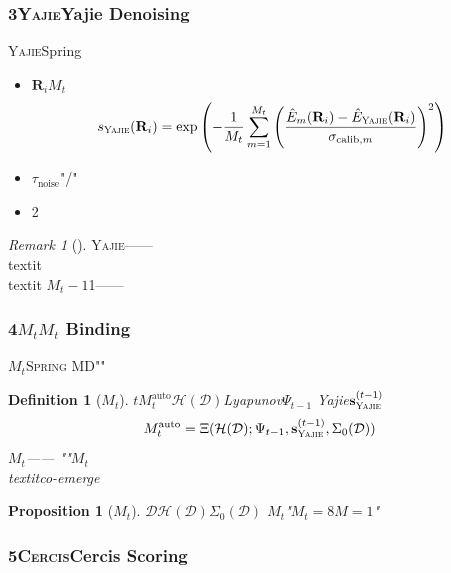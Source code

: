 \documentclass[12pt,a4paper]{article}
\newtheorem{proposition}[theorem]{Proposition}
\newtheorem{definition}[theorem]{Definition}
\theoremstyle{remark}
\newtheorem{remark}[theorem]{Remark}
\newcommand{\D}{\mathcal{D}}
\newcommand{\Yajie}{\textsc{Yajie}}
\newcommand{\Cercis}{\textsc{Cercis}}
\newcommand{\SpringMD}{\textsc{Spring MD}}
\newcommand{\Mauto}{\ensuremath{M_t^{\text{auto}}}}
\newcommand{\Lyap}{\ensuremath{\Psi}}
\newcommand{\Dhash}{\ensuremath{\mathcal{H}(\D)}}
\begin{document}
\subsubsection*{3\Yajie{}Yajie Denoising}

\Yajie{}\cite{yajie_protocol}Spring

\begin{itemize}[itemsep=3pt]
    \item \textbf{} $\mathbf{R}_i$$M_t$
    \begin{equation}\label{eq:yajie_score_spring}
        s_{\Yajie}(\mathbf{R}_i) = \exp\left(-\frac{1}{M_t} \sum_{m=1}^{M_t}
        \left(\frac{\hat{E}_m(\mathbf{R}_i) - \hat{E}_{\Yajie}(\mathbf{R}_i)}{\sigma_{\text{calib}, m}}\right)^2\right)
    \end{equation}

    \item \textbf{} $\tau_{\text{noise}}$"/"

    \item \textbf{} 2
\end{itemize}

\begin{remark}[]
\Yajie{}——\\textit{}
\\textit{}
$M_t-1$1——

\end{remark}

\subsubsection*{4$M_t$$M_t$ Binding}

$M_t$\SpringMD{}""\cite{scx_spring_trainer}

\begin{definition}[$M_t$]\label{def:Mt_binding}
$t$$\Mauto$$\Dhash$Lyapunov$\Lyap_{t-1}$
Yajie$\mathbf{s}_{\Yajie}^{(t-1)}$
\begin{equation}\label{eq:Mt_binding_formula}
    \Mauto = \Xi(\Dhash; \Lyap_{t-1}, \mathbf{s}_{\Yajie}^{(t-1)}, \Sigma_0(\D))
\end{equation}
$M_t$——
""$M_t$\\textit{}co-emerge
\end{definition}

\begin{proposition}[$M_t$]\label{prop:Mt_verifiable}
$\D$$\Dhash$$\Sigma_0(\D)$
$M_t$"$M_t=8$$M=1$"
\end{proposition}

\subsubsection*{5\Cercis{}Cercis Scoring}
\end{document}
